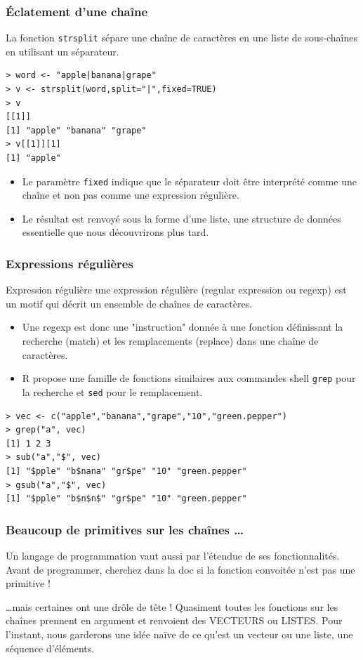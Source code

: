 \documentclass[10pt]{beamer}
\begin{document}
\begin{frame}[fragile]
  \frametitle{Éclatement d’une chaîne}
La fonction \alert{\texttt{strsplit}} sépare une chaîne de caractères en une liste de sous-chaînes en utilisant un séparateur.
\begin{lstlisting}
> word <- "apple|banana|grape"
> v <- strsplit(word,split="|",fixed=TRUE)
> v
[[1]]
[1] "apple" "banana" "grape"
> v[[1]][1]
[1] "apple"
\end{lstlisting}

\begin{itemize}
\item Le paramètre \texttt{fixed} indique que le séparateur doit être interprété comme une chaîne et non pas comme une expression régulière.
\item Le résultat est renvoyé sous la forme d’une liste, une structure de données essentielle que nous découvrirons plus tard.
\end{itemize}
\end{frame}
\begin{frame}[fragile]
  \frametitle{Expressions régulières}
  \begin{alertblock}{Expression régulière}
    une expression régulière (regular expression ou regexp) est un motif qui décrit un ensemble de chaînes de caractères. \\
\end{alertblock}
\begin{itemize}
\item Une regexp est donc une "instruction" donnée à une fonction définissant la recherche (match) et les remplacements (replace) dans une chaîne de caractères.
\item R propose une famille de fonctions similaires aux commandes shell \texttt{grep} pour la recherche et \texttt{sed} pour le remplacement.
\end{itemize}
\begin{lstlisting}
> vec <- c("apple","banana","grape","10","green.pepper")
> grep("a", vec)
[1] 1 2 3
> sub("a","$", vec)
[1] "$pple" "b$nana" "gr$pe" "10" "green.pepper"
> gsub("a","$", vec)
[1] "$pple" "b$n$n$" "gr$pe" "10" "green.pepper"
\end{lstlisting}
\end{frame}

\begin{frame}
  \frametitle{Beaucoup de primitives sur les chaînes \dots}
  Un langage de programmation vaut aussi par l'étendue de ses fonctionnalités.
  Avant de programmer, cherchez dans la doc si la fonction convoitée n'est pas une primitive !

  \begin{block}{\dots mais certaines ont une drôle de tête !}
    Quasiment toutes les fonctions sur les chaînes prennent en argument et renvoient des VECTEURS ou LISTES.
    Pour l'instant, nous garderons une idée naïve de ce qu'est un vecteur ou une liste, une séquence d’éléments.
  \end{block}

\end{frame}
\end{document}
